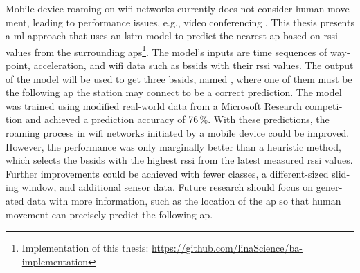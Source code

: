 \null\vfil
\begin{otherlanguage}{english}
\begin{center}\textsf{\textbf{\abstractname}}\end{center}

\noindent 
Mobile device roaming on \ac{wifi} networks currently does not consider human movement, leading to performance issues, e.g., video conferencing \cite{handoff_performance_issues}.
This thesis presents a \ac{ml} approach that uses an \ac{lstm} model to predict the nearest \ac{ap} based on \ac{rssi} values from the surrounding \acp{ap}\footnote{Implementation of this thesis: \url{https://github.com/linaScience/ba-implementation}}.
The model's inputs are time sequences of waypoint, acceleration, and \ac{wifi} data such as \acp{bssid} with their \ac{rssi} values.
The output of the model will be used to get three \acp{bssid}, named \threeAP, where one of them must be the following \ac{ap} the station may connect to be a correct prediction.
The model was trained using modified real-world data from a Microsoft Research competition and achieved a prediction accuracy of 76\,\%.
With these predictions, the roaming process in \ac{wifi} networks initiated by a mobile device could be improved.
However, the performance was only marginally better than a heuristic method, which selects the \acp{bssid} with the highest \ac{rssi} from the latest measured \ac{rssi} values.
Further improvements could be achieved with fewer classes, a different-sized sliding window, and additional sensor data.
Future research should focus on generated data with more information, such as the location of the \ac{ap} so that human movement can precisely predict the following \ac{ap}.
\end{otherlanguage}
\vfil\null




